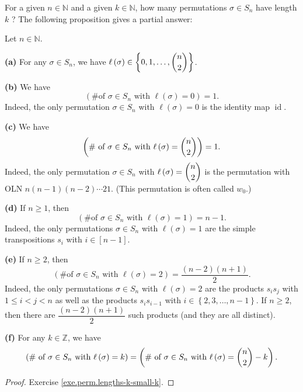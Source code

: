 For a given $n\in\mathbb{N}$ and a given $k\in\mathbb{N}$, how many
permutations $\sigma\in S_{n}$ have length $k$ ? The following proposition
gives a partial answer:

\begin{proposition}
\label{prop.perm.lengths-k-small-k}Let $n\in\mathbb{N}$. \medskip

\textbf{(a)} For any $\sigma\in S_{n}$, we have $\ell\left(  \sigma\right)
\in\left\{  0,1,\ldots,\dbinom{n}{2}\right\}  $. \medskip

\textbf{(b)} We have%
\[
\left(  \text{\# of }\sigma\in S_{n}\text{ with }\ell\left(  \sigma\right)
=0\right)  =1.
\]
Indeed, the only permutation $\sigma\in S_{n}$ with $\ell\left(
\sigma\right)  =0$ is the identity map $\operatorname*{id}$. \medskip

\textbf{(c)} We have%
\[
\left(  \text{\# of }\sigma\in S_{n}\text{ with }\ell\left(  \sigma\right)
=\dbinom{n}{2}\right)  =1.
\]
Indeed, the only permutation $\sigma\in S_{n}$ with $\ell\left(
\sigma\right)  =\dbinom{n}{2}$ is the permutation with OLN $n\left(
n-1\right)  \left(  n-2\right)  \cdots21$. (This permutation is often called
$w_{0}$.) \medskip

\textbf{(d)} If $n\geq1$, then%
\[
\left(  \text{\# of }\sigma\in S_{n}\text{ with }\ell\left(  \sigma\right)
=1\right)  =n-1.
\]
Indeed, the only permutations $\sigma\in S_{n}$ with $\ell\left(
\sigma\right)  =1$ are the simple transpositions $s_{i}$ with $i\in\left[
n-1\right]  $. \medskip

\textbf{(e)} If $n\geq2$, then%
\[
\left(  \text{\# of }\sigma\in S_{n}\text{ with }\ell\left(  \sigma\right)
=2\right)  =\dfrac{\left(  n-2\right)  \left(  n+1\right)  }{2}.
\]
Indeed, the only permutations $\sigma\in S_{n}$ with $\ell\left(
\sigma\right)  =2$ are the products $s_{i}s_{j}$ with $1\leq i<j<n$ as well as
the products $s_{i}s_{i-1}$ with $i\in\left\{  2,3,\ldots,n-1\right\}  $. If
$n\geq2$, then there are $\dfrac{\left(  n-2\right)  \left(  n+1\right)  }{2}$
such products (and they are all distinct). \medskip

\textbf{(f)} For any $k\in\mathbb{Z}$, we have%
\[
\left(  \text{\# of }\sigma\in S_{n}\text{ with }\ell\left(  \sigma\right)
=k\right)  =\left(  \text{\# of }\sigma\in S_{n}\text{ with }\ell\left(
\sigma\right)  =\dbinom{n}{2}-k\right)  .
\]

\end{proposition}

\begin{proof}
Exercise \ref{exe.perm.lengths-k-small-k}.
\end{proof}

